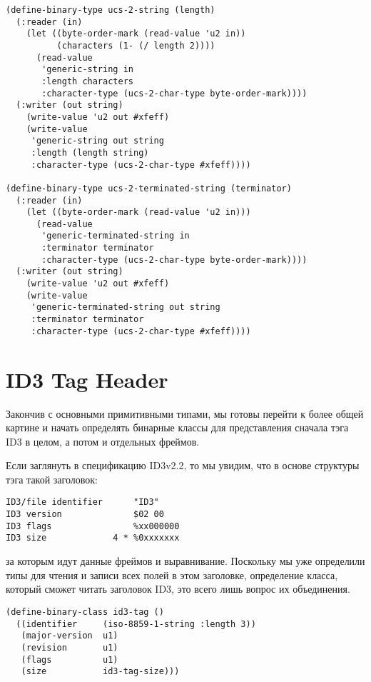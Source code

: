 \begin{lstlisting}
(define-binary-type ucs-2-string (length)
  (:reader (in)
    (let ((byte-order-mark (read-value 'u2 in))
          (characters (1- (/ length 2))))
      (read-value
       'generic-string in
       :length characters
       :character-type (ucs-2-char-type byte-order-mark))))
  (:writer (out string)
    (write-value 'u2 out #xfeff)
    (write-value
     'generic-string out string
     :length (length string)
     :character-type (ucs-2-char-type #xfeff))))

(define-binary-type ucs-2-terminated-string (terminator)
  (:reader (in)
    (let ((byte-order-mark (read-value 'u2 in)))
      (read-value
       'generic-terminated-string in
       :terminator terminator
       :character-type (ucs-2-char-type byte-order-mark))))
  (:writer (out string)
    (write-value 'u2 out #xfeff)
    (write-value 
     'generic-terminated-string out string
     :terminator terminator
     :character-type (ucs-2-char-type #xfeff))))
\end{lstlisting}

\section{ID3 Tag Header}

Закончив с основными примитивными типами, мы готовы перейти к более общей картине и начать
определять бинарные классы для представления сначала тэга ID3 в целом, а потом и отдельных
фреймов.

Если заглянуть в спецификацию ID3v2.2, то мы увидим, что в основе структуры тэга такой заголовок:

\begin{lstlisting}[style=lisprepl]
ID3/file identifier      "ID3"
ID3 version              $02 00
ID3 flags                %xx000000
ID3 size             4 * %0xxxxxxx
\end{lstlisting}

за которым идут данные фреймов и выравнивание.  Поскольку мы уже определили типы для
чтения и записи всех полей в этом заголовке, определение класса, который сможет читать
заголовок ID3, это всего лишь вопрос их объединения.

\begin{lstlisting}
(define-binary-class id3-tag ()
  ((identifier     (iso-8859-1-string :length 3))
   (major-version  u1)
   (revision       u1)
   (flags          u1)
   (size           id3-tag-size)))
\end{lstlisting}

